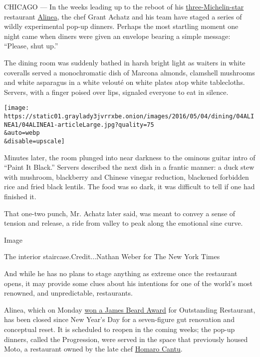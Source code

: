 CHICAGO --- In the weeks leading up to the reboot of his
\href{http://www.nytimes3xbfgragh.onion/2010/11/17/dining/17alinea.html}{three-Michelin-star}
restaurant \href{http://alinearestaurant.com/}{Alinea}, the chef Grant
Achatz and his team have staged a series of wildly experimental pop-up
dinners. Perhaps the most startling moment one night came when diners
were given an envelope bearing a simple message: ``Please, shut up.''

The dining room was suddenly bathed in harsh bright light as waiters in
white coveralls served a monochromatic dish of Marcona almonds,
clamshell mushrooms and white asparagus in a white velouté on white
plates atop white tablecloths. Servers, with a finger poised over lips,
signaled everyone to eat in silence.

\texttt{[image: https://static01.graylady3jvrrxbe.onion/images/2016/05/04/dining/04ALINEA1/04ALINEA1-articleLarge.jpg?quality=75\\\&auto=webp\\\&disable=upscale]}

Minutes later, the room plunged into near darkness to the ominous guitar
intro of ``Paint It Black.'' Servers described the next dish in a
frantic manner: a duck stew with mushroom, blackberry and Chinese
vinegar reduction, blackened forbidden rice and fried black lentils. The
food was so dark, it was difficult to tell if one had finished it.

That one-two punch, Mr. Achatz later said, was meant to convey a sense
of tension and release, a ride from valley to peak along the emotional
sine curve.

Image

The interior staircase.Credit...Nathan Weber for The New York Times

And while he has no plans to stage anything as extreme once the
restaurant opens, it may provide some clues about his intentions for one
of the world's most renowned, and unpredictable, restaurants.

Alinea, which on Monday
\href{http://www.nytimes3xbfgragh.onion/2016/05/03/dining/james-beard-awards-2016.html?ref=dining\&_r=0}{won
a James Beard Award} for Outstanding Restaurant, has been closed since
New Year's Day for a seven-figure gut renovation and conceptual reset.
It is scheduled to reopen in the coming weeks; the pop-up dinners,
called the Progression, were served in the space that previously housed
Moto, a restaurant owned by the late chef
\href{http://www.nytimes3xbfgragh.onion/2015/04/18/dining/trying-to-make-sense-of-homaro-cantus-death.html}{Homaro
Cantu}.

